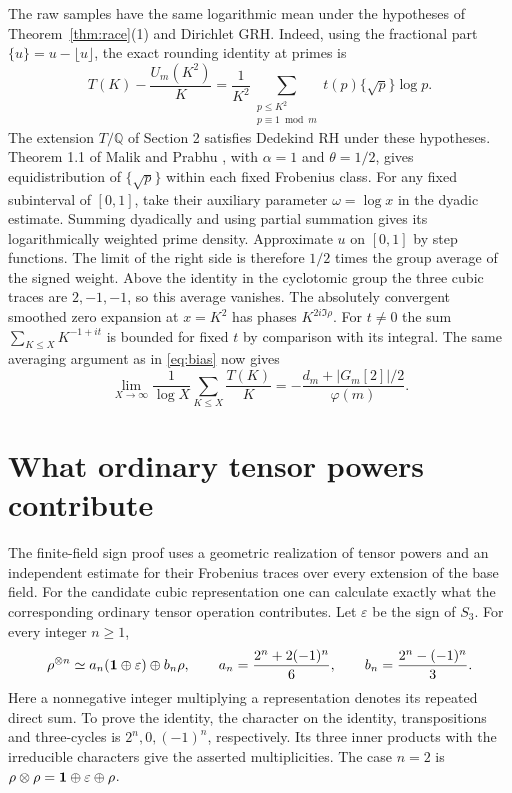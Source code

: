 \documentclass[11pt]{article}
\newcommand{\Q}{\mathbb Q}
\newcommand{\primesum}{\mathop{\sum}\limits}
\begin{document}
The raw samples have the same logarithmic mean under the hypotheses of Theorem~\ref{thm:race}(1) and Dirichlet GRH. Indeed, using the fractional part $\{u\}=u-\lfloor u\rfloor$, the exact rounding identity at primes is
\[
 T(K)-\frac{U_m(K^2)}K
 =\frac1{K^2}\primesum_{\substack{p\le K^2\\p\equiv1\bmod m}}
                  t(p)\{\sqrt p\}\log p .
\]
The extension $T/\Q$ of Section 2 satisfies Dedekind RH under these hypotheses. Theorem 1.1 of Malik and Prabhu \cite{MP}, with $\alpha=1$ and $\theta=1/2$, gives equidistribution of $\{\sqrt p\}$ within each fixed Frobenius class. For any fixed subinterval of $[0,1]$, take their auxiliary parameter $\omega=\log x$ in the dyadic estimate. Summing dyadically and using partial summation gives its logarithmically weighted prime density. Approximate $u$ on $[0,1]$ by step functions. The limit of the right side is therefore $1/2$ times the group average of the signed weight. Above the identity in the cyclotomic group the three cubic traces are $2,-1,-1$, so this average vanishes.
The absolutely convergent smoothed zero expansion at $x=K^2$ has phases $K^{2i\Im\rho}$. For $t\ne0$ the sum $\sum_{K\le X}K^{-1+it}$ is bounded for fixed $t$ by comparison with its integral. The same averaging argument as in \eqref{eq:bias} now gives
\[
 \lim_{X\to\infty}\frac1{\log X}\sum_{K\le X}\frac{T(K)}K
 =-\frac{d_m+|G_m[2]|/2}{\varphi(m)} .
\]

\section{What ordinary tensor powers contribute}
The finite-field sign proof \cite[Lemma 2 and Proposition 4]{DelSign} uses a geometric realization of tensor powers and an independent estimate for their Frobenius traces over every extension of the base field. For the candidate cubic representation one can calculate exactly what the corresponding ordinary tensor operation contributes. Let $\varepsilon$ be the sign of $S_3$. For every integer $n\ge1$,
\[
 \rho^{\otimes n}\simeq a_n({\bf1}\oplus\varepsilon)\oplus b_n\rho,
 \qquad a_n=\frac{2^n+2(-1)^n}{6},\qquad
 b_n=\frac{2^n-(-1)^n}{3}.
\]
Here a nonnegative integer multiplying a representation denotes its repeated direct sum. To prove the identity, the character on the identity, transpositions and three-cycles is $2^n,0,(-1)^n$, respectively. Its three inner products with the irreducible characters give the asserted multiplicities. The case $n=2$ is $\rho\otimes\rho={\bf1}\oplus\varepsilon\oplus\rho$.
\end{document}
